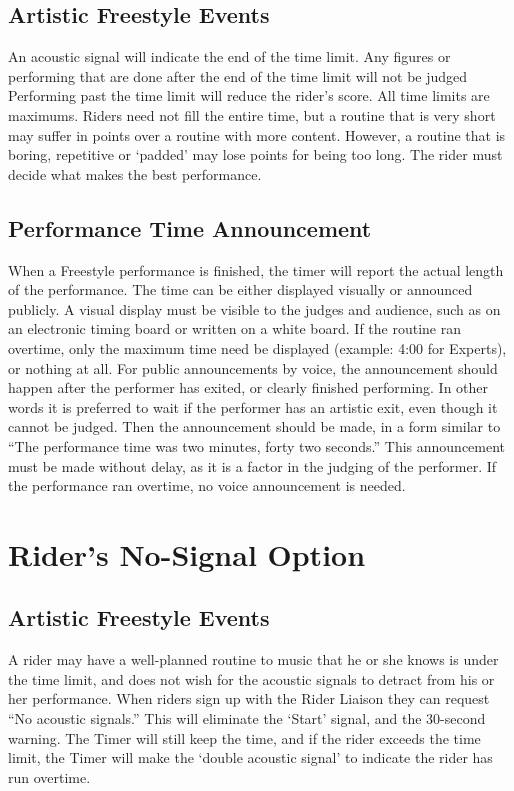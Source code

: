 \subsection{Artistic Freestyle Events}
An acoustic signal will indicate the end of the time limit.
Any figures or performing that are done after the end of the time limit will not be judged Performing past the time limit will reduce the rider's score.
All time limits are maximums.
Riders need not fill the entire time, but a routine that is very short may suffer in points over a routine with more content.
However, a routine that is boring, repetitive or `padded' may lose points for being too long.
The rider must decide what makes the best performance.

\subsection{Performance Time Announcement}
When a Freestyle performance is finished, the timer will report the actual length of the performance.
The time can be either displayed visually or announced publicly.
A visual display must be visible to the judges and audience, such as on an electronic timing board or written on a white board.
If the routine ran overtime, only the maximum time need be displayed (example: 4:00 for Experts), or nothing at all.
For public announcements by voice, the announcement should happen after the performer has exited, or clearly finished performing.
In other words it is preferred to wait if the performer has an artistic exit, even though it cannot be judged.
Then the announcement should be made, in a form similar to ``The performance time was two minutes, forty two seconds.'' This announcement must be made without delay, as it is a factor in the judging of the performer.
If the performance ran overtime, no voice announcement is needed.

\section{Rider's No-Signal Option}

\subsection{Artistic Freestyle Events}
A rider may have a well-planned routine to music that he or she knows is under the time limit, and does not wish for the acoustic signals to detract from his or her performance.
When riders sign up with the Rider Liaison they can request ``No acoustic signals.'' This will eliminate the `Start' signal, and the 30-second warning.
The Timer will still keep the time, and if the rider exceeds the time limit, the Timer will make the `double acoustic signal' to indicate the rider has run overtime.

